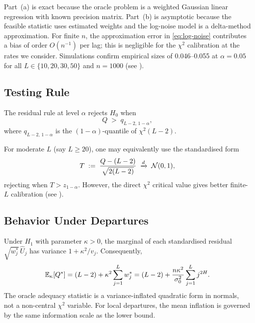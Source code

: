 \begin{remark}
    Part~(a) is exact because the oracle problem is a weighted Gaussian linear
    regression with known precision matrix.  Part~(b) is asymptotic because
    the feasible statistic uses estimated weights and the log-noise model is a
    delta-method approximation.  For finite $n$, the approximation error in
    \eqref{eq:log-noise} contributes a bias of order $O(n^{-1})$ per lag;
    this is negligible for the $\chi^2$ calibration at the rates we consider.
    Simulations confirm empirical sizes of 0.046--0.055 at $\alpha = 0.05$
    for all $L \in \{10,20,30,50\}$ and $n = 1000$ (see ).
\end{remark}

\subsection{Testing Rule}

The residual rule at level $\alpha$ rejects $H_0$ when
\begin{equation}
    Q \;>\; q_{L-2,\,1-\alpha},
    \label{eq:test-rule}
\end{equation}
where $q_{L-2,\,1-\alpha}$ is the $(1-\alpha)$-quantile of $\chi^2(L-2)$.

For moderate $L$ (say $L \geq 20$), one may equivalently use the
standardised form
\[
    T \;:=\; \frac{Q - (L-2)}{\sqrt{2(L-2)}} \;\xrightarrow{d}\; \mathcal{N}(0,1),
\]
rejecting when $T > z_{1-\alpha}$.  However, the direct $\chi^2$ critical
value gives better finite-$L$ calibration (see ).

\subsection{Behavior Under Departures}

\begin{proposition}
\label{prop:alternative-response}
Under $H_1$ with parameter $\kappa > 0$, the marginal of each standardised
residual $\sqrt{w_j^*}\,\widehat U_j$ has variance $1 + \kappa^2/v_j$.
Consequently,
\[
    \mathbb{E}_\kappa[Q^*]
    = (L-2) + \kappa^2 \sum_{j=1}^L w_j^*
    = (L-2) + \frac{n\kappa^2}{\sigma_0^2}\sum_{j=1}^L j^{2H}.
\]
The oracle adequacy statistic is a variance-inflated quadratic form in normals,
not a non-central $\chi^2$ variable.  For local departures, the mean inflation
is governed by the same information scale as the lower bound.
\end{proposition}

